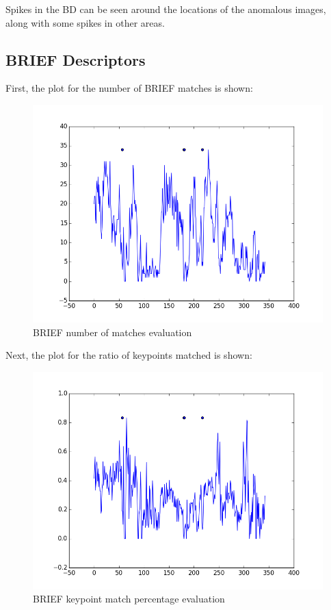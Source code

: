 Spikes in the BD can be seen around the locations of the anomalous images, along with some spikes in other areas.

\subsection{BRIEF Descriptors}

First, the plot for the number of BRIEF matches is shown:

\begin{figure}[h]
\centering
\includegraphics[scale=.50]{figures/611nummatchestest}
\caption{BRIEF number of matches evaluation}
\label{fig:tamu-fig3}
\end{figure}

Next, the plot for the ratio of keypoints matched is shown:

\begin{figure}[h]
\centering
\includegraphics[scale=.50]{figures/611matchratiostest}
\caption{BRIEF keypoint match percentage evaluation}
\label{fig:tamu-fig3}
\end{figure}

